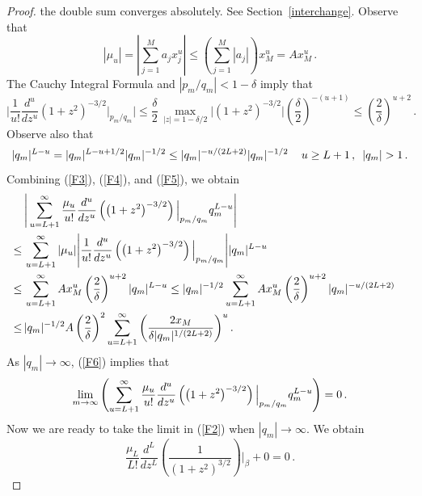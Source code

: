\documentclass{article}
\theoremstyle{remark}
\numberwithin{equation}{section}
\begin{document}
\begin{proof}
the double sum converges absolutely. See Section~\ref{interchange}. 
Observe that
\begin{equation}\label{F3}
|\mu_u| = \left| \sum_{j=1}^M{a_jx_j^u} \right| \leq \left( \sum_{j=1}^M{|a_j|} \right) x_M^u = A x_M^u\,.
\end{equation}
The Cauchy Integral Formula and $|p_m/q_m| < 1-\delta$ imply that
\begin{equation}\label{F4}
\Bigg| \frac{1}{u!} \frac{d^u}{dz^u}\left( 1 + z^2 \right)^{-3/2} 
 \Big|_{p_m/q_m} \Bigg| 
\leq \frac{\delta}{2} \, \max_{|z| = 1 - \delta/2} {\Bigg| \left( 1 + z^2 \right)^{-3/2} \Bigg|} \left( \frac{\delta}{2} \right)^{-(u+1)} \leq \left( \frac{2}{\delta} \right)^{u+2}\,.
\end{equation}
Observe also that
\begin{equation}\label{F5}
|q_m|^{L-u} = |q_m|^{L-u+1/2} |q_m|^{-1/2} \leq |q_m|^{-u/(2L+2)} |q_m|^{-1/2}\, \quad u \geq L+1\,, \enskip |q_m| > 1\,. 
\end{equation}
Combining  (\ref{F3}), (\ref{F4}), and (\ref{F5}),  we obtain
\begin{equation} \label{F6}
\begin{split}
& \, \Bigg| \sum_{u=L+1}^\infty{\frac{\mu_u}{u!} \frac{d^u}{dz^u} \left( \left( 1 + z^2 \right)^{-3/2} \right) \Big|_{p_m/q_m}} q_m^{L-u} \Bigg| \cr 
\leq & \, \sum_{u=L+1}^\infty{ |\mu_u| \Bigg| \frac{1}{u!} \frac{d^u}{dz^u} \left( \left( 1 + z^2 \right)^{-3/2} \right) \Big|_{p_m/q_m} \Bigg| |q_m|^{L-u}} \cr 
\leq & \, \sum_{u=L+1}^\infty{A x_M^u \left( \frac{2}{\delta} \right)^{u+2}  |q_m|^{L-u}} 
\leq |q_m|^{-1/2} \sum_{u=L+1}^\infty{A x_M^u \left( \frac{2}{\delta} \right)^{u+2} |q_m|^{-u/(2L+2)}} \cr
\leq & \, |q_m|^{-1/2} A\left( \frac{2}{\delta} \right)^2 \sum_{u=L+1}^\infty{\left( \frac{2x_M}{\delta |q_m|^{1/(2L+2)}} \right)^u}\,. \cr 
\end{split}
\end{equation}
As $|q_m| \rightarrow \infty$, (\ref{F6}) implies that
\begin{equation} \notag
\lim_{m \rightarrow \infty}{ \left( \sum_{u=L+1}^\infty{\frac{\mu_u}{u!} \frac{d^u}{dz^u} \left( \left( 1 + z^2 \right)^{-3/2} \right) \Big|_{p_m/q_m}} q_m^{L-u} \right)} = 0\,.
\end{equation}
Now we are ready to take the limit in (\ref{F2}) when $|q_m| \rightarrow \infty$. We obtain
$$\frac{\mu_L}{L!} \frac{d^L}{d z^L} \left( \frac{1}{(1+z^2)^{3/2}} \right)\bigg |_\beta  + 0 = 0\,.$$
\end{proof}
\end{document}
